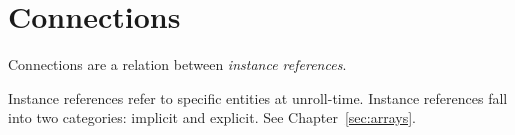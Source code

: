 
\chapter{Connections}
\label{sec:connections}

Connections are a relation between \emph{instance references}.  

Instance references refer to specific entities at unroll-time.  
Instance references fall into two categories: implicit and explicit.  
See Chapter~\ref{sec:arrays}.  

